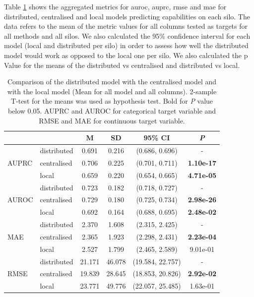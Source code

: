 
Table \ref{tab:allvsall} shows the aggregated metrics for \ac{auroc}, \ac{auprc}, \ac{rmse} and \ac{mae} for distributed, centralised and local models predicting capabilities on each silo. The data refers to the mean of the metric values for all columns tested as targets for all methods and all silos. We also calculated the 95\% confidence interval for each model (local and distributed per silo) in order to assess how well the distributed model would work as opposed to the local one per silo. We also calculated the p Value for the means of the distributed vs centralised and distributed vs local.

\begin{table}[h!] 
 \setlength{\tabcolsep}{7pt} %
 \renewcommand{\arraystretch}{1.3} %
  \captionsetup{justification=centering} 
\centering
\caption[Metrics for centralised model, distributed model and local model]{Comparison of the distributed model with the centralised model and with the local model (Mean for all model and all columns). 2-sample T-test for the means was used as hypothesis test. Bold for \textit{P} value below 0.05. AUPRC and AUROC for categorical target variable and RMSE and MAE for continuous target variable.}

\label{tab:allvsall}
\begin{tabular}{llcccc}
\toprule
 &  & M & SD & 95\% CI & \textit{P}  \\
\midrule
\multirow{3}{*}{AUPRC}
 & distributed & 0.691 & 0.216 & (0.686, 0.696) & - \\
  & centralised & 0.706 & 0.225 & (0.701, 0.711) & \bfseries 1.10e-17 \\
 & local & 0.659 & 0.220 & (0.654, 0.665) & \bfseries 4.71e-05 \\
 \hline

\multirow{3}{*}{AUROC} 
 & distributed & 0.723 & 0.182 & (0.718, 0.727) & - \\
 & centralised & 0.729 & 0.180 & (0.725, 0.734) & \bfseries 2.98e-26 \\
 & local & 0.692 & 0.164 & (0.688, 0.695) & \bfseries 2.48e-02 \\

\hline

\multirow{3}{*}{MAE} 
 & distributed & 2.370 & 1.608 & (2.315, 2.425) & - \\
 & centralised & 2.365 & 1.923 & (2.298, 2.431) & \bfseries 2.23e-04 \\
 & local & 2.527 & 1.799 & (2.465, 2.589) & 9.01e-01 \\

\hline

\multirow{3}{*}{RMSE} 
 & distributed & 21.171 & 46.078 & (19.584, 22.757) & - \\
 & centralised & 19.839 & 28.645 & (18.853, 20.826) & \bfseries 2.92e-02 \\
 & local & 23.771 & 49.776 & (22.057, 25.485) & 1.63e-01 \\
\hline
\end{tabular}
\end{table}
